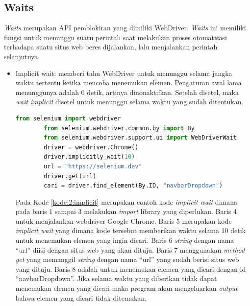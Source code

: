 \subsection{Waits}
\textit{Waits} merupakan API pemblokiran yang dimiliki WebDriver. \textit{Waits} ini memiliki fungsi untuk menunggu suatu perintah saat melakukan proses otomatisasi terhadapa suatu situs web beres dijalankan, lalu menjalankan perintah selanjutnya. 
\begin{itemize}
	\item Implicit wait: memberi tahu WebDriver untuk menunggu selama jangka waktu tertentu ketika mencoba menemukan elemen. Pengaturan awal lama menunggunya adalah 0 detik, artinya dinonaktifkan. Setelah disetel, maka \textit{wait implicit} disetel untuk menunggu selama waktu yang sudah ditentukan.
	\begin{lstlisting}[language=python, caption=Contoh kode Implicit wait, label=kode:2:implicit]
		from selenium import webdriver
		from selenium.webdriver.common.by import By
		from selenium.webdriver.support.ui import WebDriverWait
		driver = webdriver.Chrome()
		driver.implicitly_wait(10)
		url = "https://selenium.dev"
		driver.get(url)
		cari = driver.find_element(By.ID, "navbarDropdown")
	\end{lstlisting}
	Pada Kode \ref{kode:2:implicit} merupakan contoh kode \textit{implicit wait} dimana pada baris 1 sampai 3 melakukan \textit{import} library yang diperlukan. Baris 4 untuk menjalankan webdriver Google Chrome. Baris 5 merupakan kode \textit{implicit wait} yang dimana kode tersebut memberikan waktu selama 10 detik untuk menemukan elemen yang ingin dicari. Baris 6 \textit{string} dengan nama ``url'' diisi dengan situs web yang akan dituju. Baris 7 menggunakan \textit{method get} yang memanggil \textit{string} dengan nama ``url'' yang sudah berisi situs web yang dituju. Baris 8 adalah untuk menemukan elemen yang dicari dengan id ``navbarDropdown''. Jika selama waktu yang diberikan tidak dapat menemukan elemen yang dicari maka program akan mengeluarkan \textit{output} bahwa elemen yang dicari tidak ditemukan.
	

\end{itemize}
